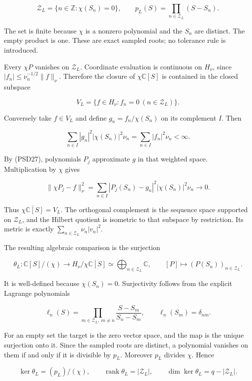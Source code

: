 \documentclass{article}
\begin{document}
\[
\mathcal Z_L=\{n\in\mathbb Z:\chi(S_n)=0\},\qquad
p_L(S)=\prod_{n\in\mathcal Z_L}(S-S_n).
\tag{PSD28}
\]

The set is finite because \(\chi\) is a nonzero polynomial and the \(S_n\) are distinct. The empty product is one. These are exact sampled roots; no tolerance rule is introduced.

Every \(\chi P\) vanishes on \(\mathcal Z_L\). Coordinate evaluation is continuous on \(H_\nu\), since \(|f_n|\le\nu_n^{-1/2}\|f\|_\nu\). Therefore the closure of \(\chi \mathbb C[S]\) is contained in the closed subspace

\[
V_L=\{f\in H_\nu:f_n=0\ (n\in\mathcal Z_L)\}.
\]

Conversely take \(f \in V_L\) and define \(g_n=f_n/\chi(S_n)\) on its complement \(I\). Then

\[
\sum_{n\in I}|g_n|^2|\chi(S_n)|^2\nu_n
=\sum_{n\in I}|f_n|^2\nu_n<\infty.
\]

By (PSD27), polynomials \(P_j\) approximate \(g\) in that weighted space. Multiplication by \(\chi\) gives

\[
\|\chi P_j-f\|_\nu^2
=\sum_{n\in I}|P_j(S_n)-g_n|^2|\chi(S_n)|^2\nu_n\longrightarrow0.
\tag{PSD29}
\]

Thus \(\overline{\chi\mathbb C[S]}=V_L\). The orthogonal complement is the sequence space supported on \(\mathcal Z_L\), and the Hilbert quotient is isometric to that subspace by restriction. Its metric is exactly \(\sum_{n\in\mathcal Z_L}\nu_n|v_n|^2\).

The resulting algebraic comparison is the surjection

\[
\theta_L:\mathbb C[S]/(\chi)\longrightarrow
H_\nu/\overline{\chi\mathbb C[S]}
\simeq\bigoplus_{n\in\mathcal Z_L}\mathbb C,
\qquad [P]\longmapsto(P(S_n))_{n\in\mathcal Z_L}.
\tag{PSD30}
\]

It is well-defined because \(\chi(S_n)=0\). Surjectivity follows from the explicit Lagrange polynomials

\[
\ell_n(S)=\prod_{m\in\mathcal Z_L,\ m\ne n}\frac{S-S_m}{S_n-S_m},
\qquad \ell_n(S_m)=\delta_{nm}.
\tag{PSD31}
\]

For an empty set the target is the zero vector space, and the map is the unique surjection onto it. Since the sampled roots are distinct, a polynomial vanishes on them if and only if it is divisible by \(p_L\). Moreover \(p_L\) divides \(\chi\). Hence

\[
\ker\theta_L=(p_L)/(\chi),\qquad
\operatorname{rank}\theta_L=|\mathcal Z_L|,\qquad
\dim\ker\theta_L=q-|\mathcal Z_L|.
\tag{PSD32}
\]
\end{document}
